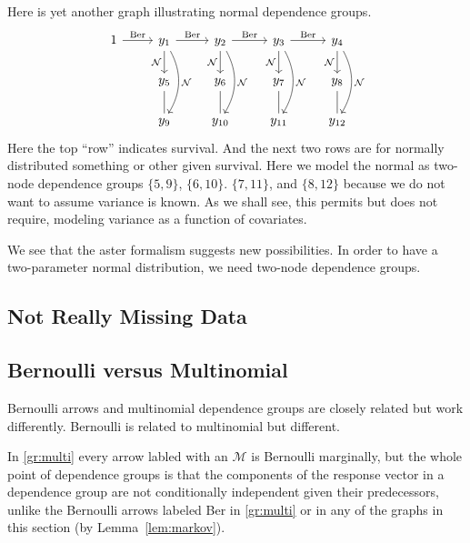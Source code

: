 Here is yet another graph illustrating normal dependence groups.
\begin{equation} \label{gr:normal}
\begin{tikzcd}
   1
   \arrow{r}{\text{Ber}}
   & y_1
   \arrow{d}[swap]{\mathcal{N}}
   \arrow[bend left]{dd}{\mathcal{N}}
   \arrow{r}{\text{Ber}}
   & y_2
   \arrow{d}[swap]{\mathcal{N}}
   \arrow[bend left]{dd}{\mathcal{N}}
   \arrow{r}{\text{Ber}}
   & y_3
   \arrow{d}[swap]{\mathcal{N}}
   \arrow[bend left]{dd}{\mathcal{N}}
   \arrow{r}{\text{Ber}}
   & y_4
   \arrow{d}[swap]{\mathcal{N}}
   \arrow[bend left]{dd}{\mathcal{N}}
   \\
   \hphantom{1}
   & y_5 \arrow[dash]{d}
   & y_6 \arrow[dash]{d}
   & y_7 \arrow[dash]{d}
   & y_8 \arrow[dash]{d}
   \\
   \hphantom{1} & y_9 & y_{10} & y_{11} & y_{12}
\end{tikzcd}
\end{equation}
Here the top ``row'' indicates survival.  And the next two rows are
for normally distributed something or other given survival.  Here we
model the normal as two-node dependence groups
$\{ 5, 9 \}$,
$\{ 6, 10 \}$.
$\{ 7, 11 \}$, and
$\{ 8, 12 \}$ because
we do not want to assume variance is known.  As we shall see, this permits
but does not require, modeling variance as a function of covariates.

We see that the aster formalism suggests new possibilities.  In order to
have a two-parameter normal distribution, we need two-node dependence groups.

\subsection{Not Really Missing Data}

\subsection{Bernoulli versus Multinomial}

Bernoulli arrows and multinomial dependence groups are closely related but
work differently.  Bernoulli is related to multinomial but different.

In \eqref{gr:multi} every arrow labled with an $\mathcal{M}$ is Bernoulli
marginally, but the whole point of dependence groups is that the components
of the response vector in a dependence group are not
conditionally independent given their predecessors, unlike the Bernoulli
arrows labeled Ber in \eqref{gr:multi} or in any of the graphs in this
section (by Lemma~\ref{lem:markov}).

